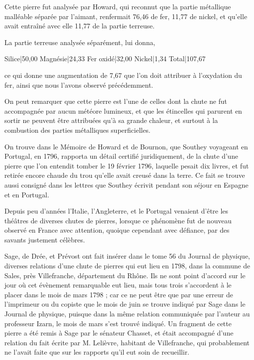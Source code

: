 \documentclass[a4paper, 12pt, oneside, french]{article}
\begin{document}
Cette pierre fut analysée par Howard, qui reconnut que la partie métallique malléable séparée par l'aimant, renfermait 76,46 de fer, 11,77 de nickel, et qu'elle avait entraîné avec elle 11,77 de la partie terreuse.

La partie terreuse analysée séparément, lui donna,

Silice|50,00  
Magnésie|24,33  
Fer oxidé|32,00  
Nickel|1,34  
Total|107,67

ce qui donne une augmentation de 7,67 que l'on doit attribuer à l'oxydation du fer, ainsi que nous l'avons observé précédemment.

On peut remarquer que cette pierre est l'une de celles dont la chute ne fut accompagnée par aucun météore lumineux, et que les étincelles qui parurent en sortir ne peuvent être attribuées qu'à sa grande chaleur, et surtout à la combustion des parties métalliques superficielles.

On trouve dans le Mémoire de Howard et de Bournon, que Southey voyageant en Portugal, en 1796, rapporta un détail certifié juridiquement, de la chute d'une pierre que l'on entendit tomber le 19 février 1796, laquelle pesait dix livres, et fut retirée encore chaude du trou qu'elle avait creusé dans la terre. Ce fait se trouve aussi consigné dans les lettres que Southey écrivit pendant son séjour en Espagne et en Portugal.

Depuis peu d'années l'Italie, l'Angleterre, et le Portugal venaient d'être les théâtres de diverses chutes de pierres, lorsque ce phénomène fut de nouveau observé en France avec attention, quoique cependant avec défiance, par des savants justement célèbres.

Sage, de Drée, et Prévost ont fait insérer dans le tome 56 du Journal de physique, diverses relations d'une chute de pierres qui eut lieu en 1798, dans la commune de Sales, près Villefranche, département du Rhône. Ils ne sont point d'accord sur le jour où cet évènement remarquable eut lieu, mais tous trois s'accordent à le placer dans le mois de mars 1798 ; car ce ne peut être que par une erreur de l'imprimeur ou du copiste que le mois de juin se trouve indiqué par Sage dans le Journal de physique, puisque dans la même relation communiquée par l'auteur au professeur Izarn, le mois de mars s'est trouvé indiqué. Un fragment de cette pierre a été remis à Sage par le sénateur Chasset, et était accompagné d'une relation du fait écrite par M. Lelièvre, habitant de Villefranche, qui probablement ne l'avait faite que sur les rapports qu'il eut soin de recueillir.
\end{document}
